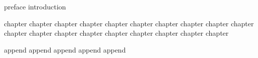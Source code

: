 \documentclass{claynote}
\begin{document}
\begin{void}
{

    \begin{pre}
        {preface}
        {introduction}
    \end{pre}

    \begin{body}
        {chapter}
        {chapter}
        {chapter}
        {chapter}
        {chapter}
        {chapter}
        {chapter}
        {chapter}
        {chapter}
        {chapter}
        {chapter}
        {chapter}
        {chapter}
        {chapter}
        {chapter}
        {chapter}
        {chapter}
        {chapter}
        {chapter}
    \end{body}

    \begin{append}
        {append}
        {append}
        {append}
        {append}
        {append}
    \end{append}
}
\end{void}
\end{document}
